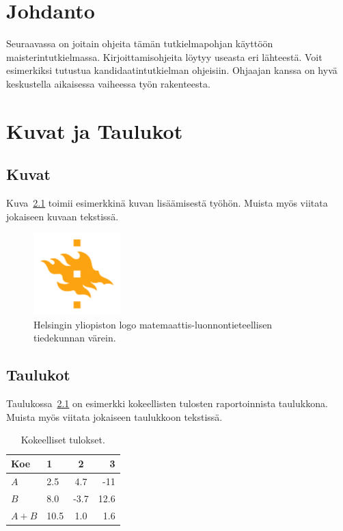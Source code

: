 \chapter{Johdanto}

Seuraavassa on joitain ohjeita tämän tutkielmapohjan käyttöön maisterintutkielmassa. Kirjoittamisohjeita löytyy useasta eri lähteestä. Voit esimerkiksi tutustua kandidaatintutkielman ohjeisiin. 
Ohjaajan kanssa on hyvä keskustella aikaisessa vaiheessa työn rakenteesta.

\chapter{Kuvat ja Taulukot}

\section{Kuvat}
Kuva~\ref{fig:logo} toimii esimerkkinä kuvan lisäämisestä työhön. Muista myös viitata jokaiseen kuvaan tekstissä. 

\begin{figure}[h!] %
\centering 
\includegraphics[width=0.3\textwidth]{template/figures/HY-logo-ml.png}
\caption{Helsingin yliopiston logo matemaattis-luonnontieteellisen tiedekunnan värein.\label{fig:logo}}
\end{figure}

\section{Taulukot}

Taulukossa~\ref{table:results} on esimerkki kokeellisten tulosten raportoinnista taulukkona. Muista myös viitata jokaiseen taulukkoon tekstissä.

\begin{table}[h!]
\centering
\caption{Kokeelliset tulokset.\label{table:results}}
\begin{tabular}{l||l c r} 
Koe & 1 & 2 & 3 \\ 
\hline \hline 
$A$ & 2.5 & 4.7 & -11 \\
$B$ & 8.0 & -3.7 & 12.6 \\
$A+B$ & 10.5 & 1.0 & 1.6 \\
\hline
%
\end{tabular}
\end{table}

